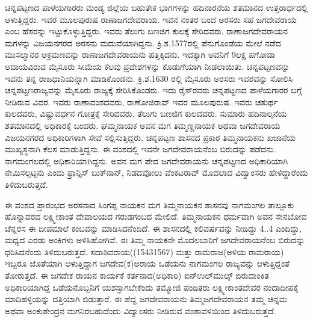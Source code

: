 ಚನ್ನಪಟ್ಟಣದ ಪಾಳೆಯಗಾರರು ಮಂಡ್ಯ ಜಿಲ್ಲೆಯ ಬಹುತೇಕ ಭಾಗಗಳನ್ನು ಹದಿನಾರನೆಯ ಶತಮಾನದ ಉತ್ತರಾರ್ಧದಲ್ಲಿ ಆಳುತ್ತಿದ್ದರು. ಇವರ ಮೂಲಪುರುಷ ರಾಣಾಜಗದೇವರಾಯ. ಇವನ ನಂತರ ಬಂದ ಅರಸರು ಸಹ ಜಗದೇವರಾಯ ಎಂಬ ಹೆಸರನ್ನು ಇಟ್ಟುಕೊಳ್ಳುತ್ತಿದ್ದರು. ಇವರು ತೆಲುಗು ಬಣಜಿಗ ಕುಲಕ್ಕೆ ಸೇರಿದವರು. ರಾಣಾಜಗದೇವರಾಯನ ಮಗಳನ್ನು ವಿಜಯನಗರದ ಅರಸನು ಮದುವೆಯಾಗಿದ್ದನು. ಕ್ರಿ.ಶ.1577ರಲ್ಲಿ ಪೆನುಗೊಂಡೆಯ ಮೇಲೆ ನಡೆದ ಮುಸಲ್ಮಾನರ ಆಕ್ರಮಣವನ್ನು ರಾಣಾಜಗದೇವರಾಯನು ಹತ್ತಿಕ್ಕಿದನು. ಇದಕ್ಕಾಗಿ ಅವನಿಗೆ 9ಲಕ್ಷ ಪಗೋಡಾ ಆದಾಯವಿರುವ ಮೈಸೂರು ಸೀಮೆಯ ಕೆಲವು ಪ್ರದೇಶಗಳನ್ನು ಕೊಡುಗೆಯಾಗಿ ನೀಡಲಾಯಿತು. ಚನ್ನಪಟ್ಟಣವನ್ನು ಇವನು ತನ್ನ ರಾಜಧಾನಿಯನ್ನಾಗಿ ಮಾಡಿಕೊಂಡನು. ಕ್ರಿ.ಶ.1630 ರಲ್ಲಿ ಮೈಸೂರು ಅರಸರು ಇವರವನ್ನು ಸೋಲಿಸಿ ಚನ್ನಪಟ್ಟಣರಾಜ್ಯವನ್ನು ಮೈಸೂರು ರಾಜ್ಯಕ್ಕೆ ಸೇರಿಸಿಕೊಂಡರು. ಇದು ರೈಸ್​ರವರು ಚನ್ನಪಟ್ಟಣದ ಪಾಳೆಯಗಾರರ ಬಗ್ಗೆ ನೀಡಿರುವ ವಿವರ. ಇವರು ರಾಣಾವಂಶದವರು, ರಾಣೋಜಿರಾವ್​ ಇವರ ಮೂಲಪುರುಷ. ಇವರು ಚತುರ್ಥ ಕುಲದವರು, ವಿಷ್ಣುವರ್ಧನ ಗೋತ್ರಕ್ಕೆ ಸೇರಿದವರು. ತೆಲುಗು ಬಣಜಿಗ ಕುಲದವರು. ಸುಮಾರು ಹದಿನಾಲ್ಕನೆಯ ಶತಮಾನದಲ್ಲಿ ಅಧಿಕಾರಕ್ಕೆ ಬಂದರು. ಘಮ್ಮನಾಯಕ ಅವನ ಮಗ ತಿಮ್ಮಣ್ಣನಾಯಕ ಅಥವಾ ಜಗದೇವರಾಯ ವಿಜಯನಗರದ ಅಧಿಕಾರಿಗಳಾಗಿ ಸೇವೆ ಸಲ್ಲಿಸುತ್ತಿದ್ದರು. ಚನ್ನಪಟ್ಟಣ ಶಾಸನದ ಪ್ರಕಾರ ತಿಮ್ಮನಾಯಕನು ಖಜಾನೆಯ ಮುಖ್ಯಸ್ಥನಾಗಿ ಕೆಲಸ ಮಾಡುತ್ತಿದ್ದನು. ಈ ವಂಶದಲ್ಲಿ ಇವನೇ ಜಗದೇವರಾಯನೆಂಬ ಬಿರುದನ್ನು ಪಡೆದನು. ನಾಗಮಂಗಲದಲ್ಲಿ ಅಧಿಕಾರಿಯಾಗಿದ್ದನು. ಅವನ ಮಗ ಪೇದ ಜಗದೇವರಾಯನು ಚನ್ನಪಟ್ಟಣದ ಅಧಿಕಾರಿಯಾಗಿ ನೇಮಿಸಲ್ಪಟ್ಟನು ಎಂದು ಫ್ರಾನ್ಸಿಸ್​ ಬುಕ್​ನಾನ್​, ನಿಡದವೋಲು ವೆಂಕಟರಾವ್​ ಮೊದಲಾದ ವಿದ್ವಾಂಸರು ಹೇಳಿದ್ದಾರೆಂದು ತಿಳಿದುಬರುತ್ತದೆ.

ಈ ವಂಶದ ಪ್ರಾರಂಭದ ಅರಸನಾದ ಸಿಂಗಪ್ಪ ನಾಯಕನ ಮಗ ತಿಮ್ಮನಾಯಕನ ಶಾಸನವು ನಾಗಮಂಗಲ ತಾಲ್ಲೂಕು ಹೊನ್ನಾವರದ ಲಕ್ಷ್ಮೀಕಾಂತ ದೇವಾಲಯದ ಗರುಡಗಂಬದ ಮೇಲಿದೆ. ತಿಮ್ಮನಾಯಕನ ಧರ್ಮವಾಗಿ ಅವನ ಸೇನಬೋವ ಚೆನ್ನರಸ ಈ ದೀಪಮಾಲೆ ಕಂಬವನ್ನು ಮಾಡಿಸಿದನೆಂದಿದೆ. ಈ ಶಾಸನದಲ್ಲಿ ಕಲಿವರ್ಷವನ್ನು ನೀಡಿದ್ದು 4..4 ಎಂದಿದ್ದು, ಮಧ್ಯದ ಎರಡು ಅಂಕಿಗಳು ಅಳಿಸಿಹೋಗಿವೆ. ಈ ತಿಮ್ಮ ನಾಯಕನೇ ಮೊದಲಬಾರಿಗೆ ಜಗದೇವರಾಯನೆಂಬ ಬಿರುದನ್ನು ಧರಿಸಿದನೆಂದು ತಿಳಿದುಬರುತ್ತದೆ. ಸದಾಶಿವರಾಯ((15431567) ಮತ್ತು ರಾಮರಾಜ(ಅಳಿಯ ರಾಮರಾಯ) ಇಬ್ಬರೂ ಜೊತೆಯಾಗಿ ಆಳುತ್ತಿದ್ದಾಗ ಜಗದೇವ(ಕ)ಅರಾಯ ಒಡೆಯನು ನಾಗಮಂಗಲ ರಾಜ್ಯವನ್ನು ಆಳುತ್ತಿದ್ದಂತೆ ತೋರುತ್ತದೆ. ಈ ಜಗದೇಕ ರಾಯನ ಕಾರ್ಯಕೆ ಕರ್ತನಾದ(ಅಧಿಕಾರಿ) ಐನ್​ಉಲ್​ಮುಲ್ಕ್​ ಬಿರುದಾಂಕಿತ ಅಧಿಕಾರಿಯಾಗಿದ್ದ ಒಡೆಯನೊಬ್ಬನಿಗೆ ಯಶಸ್ಸಾಗಬೇಕೆಂದು ತಮ್ಮೋಜಿ ಪಂಡಿತರು ಲಕ್ಷ್ಮೀಕಾಂತದೇವರ ನಂದಾದೀಪಕ್ಕೆ ಮಾದಿಹಳ್ಳಿಯನ್ನು ದತ್ತಿಯಾಗಿ ಬಿಡುತ್ತಾರೆ. ಈ ಪೆದ್ದ ಜಗದೇವರಾಯನು ತಿಮ್ಮಜಗದೇವರಾಯನ ತಮ್ಮ ಚಿನ್ನಮ ಅಥವಾ ಅಂಕುಶೇಂದ್ರನ ಮಗನಿರಬಹುದೆಂದು ವಿದ್ವಾಂಸರು ನೀಡಿರುವ ವಂಶಾವಳಿಯಿಂದ ತಿಳಿದುಬರುತ್ತದೆ.

